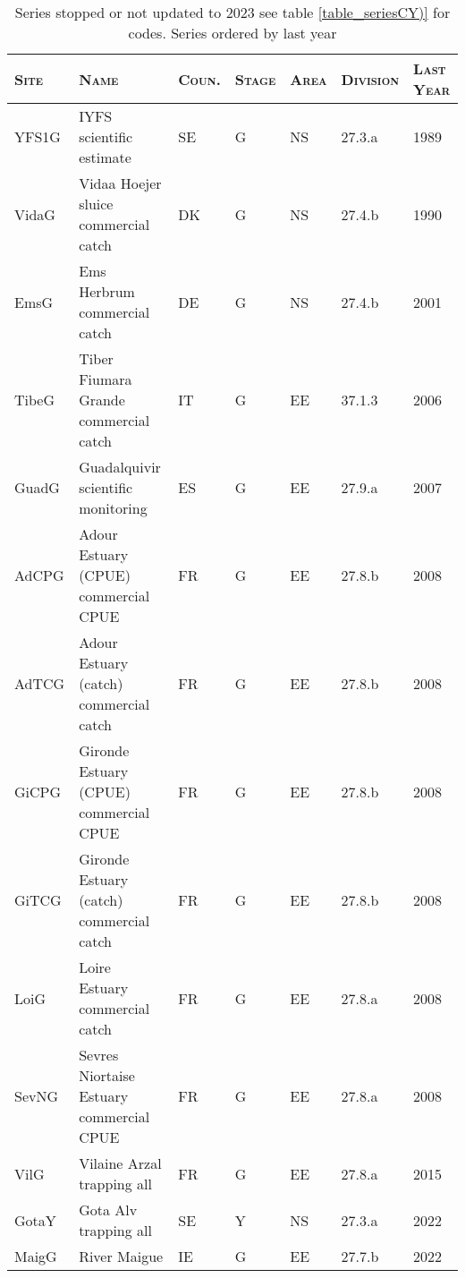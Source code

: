 \begin{table}[htbp]
\centering
\caption{Series stopped or not updated to 2023 see table \ref{table_seriesCY)} for codes. Series ordered by last year} 
\label{table_serieslost}
\begin{tabularx}{\textwidth}{p{1.3cm}p{6.5cm}p{1cm}p{1cm}p{1cm}p{1.4cm}p{1.2cm}}
  \hline
\scshape{Site} & \scshape{Name} & \scshape{Coun.} & \scshape{Stage} & \scshape{Area} & \scshape{Division} & \scshape{Last Year} \\ 
  \hline
YFS1G & IYFS scientific estimate & SE & G & NS & 27.3.a & 1989 \\ 
  VidaG & Vidaa Hoejer sluice commercial catch & DK & G & NS & 27.4.b & 1990 \\ 
  EmsG & Ems Herbrum commercial catch & DE & G & NS & 27.4.b & 2001 \\ 
  TibeG & Tiber Fiumara Grande commercial catch & IT & G & EE & 37.1.3 & 2006 \\ 
  GuadG & Guadalquivir scientific monitoring & ES & G & EE & 27.9.a & 2007 \\ 
  AdCPG & Adour Estuary (CPUE) commercial CPUE & FR & G & EE & 27.8.b & 2008 \\ 
  AdTCG & Adour Estuary (catch) commercial catch & FR & G & EE & 27.8.b & 2008 \\ 
  GiCPG & Gironde Estuary (CPUE) commercial CPUE & FR & G & EE & 27.8.b & 2008 \\ 
  GiTCG & Gironde Estuary (catch) commercial catch & FR & G & EE & 27.8.b & 2008 \\ 
  LoiG & Loire Estuary commercial catch & FR & G & EE & 27.8.a & 2008 \\ 
  SevNG & Sevres Niortaise Estuary commercial CPUE & FR & G & EE & 27.8.a & 2008 \\ 
  VilG & Vilaine Arzal trapping all & FR & G & EE & 27.8.a & 2015 \\ 
  GotaY & Gota Alv  trapping all & SE & Y & NS & 27.3.a & 2022 \\ 
  MaigG & River Maigue & IE & G & EE & 27.7.b & 2022 \\ 
   \hline
\end{tabularx}
\end{table}
